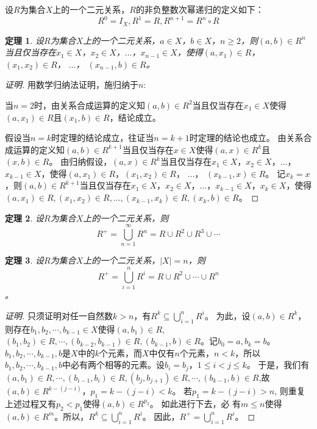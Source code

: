 \documentclass{book}[oneside]
\newtheorem{Thm}{定理}[chapter]
\begin{document}
\begin{CJK*}{UTF8}{gbsn}
  设$R$为集合$X$上的一个二元关系，$R$的非负整数次幂递归的定义如下：
  \[R^0=I_X,R^1=R,R^{n+1}=R^{n}\circ R\]

    \begin{Thm}
    设$R$为集合$X$上的一个二元关系，$a \in X$，$b \in X$，$n \geq 2$，则$(a,b) \in R^n$当且仅当存在$x_1\in X$，$x_2\in X$，$\ldots$，$x_{n-1}\in X$，使得$(a, x_1) \in R$，$(x_1, x_2)\in R$，  $\ldots$， $(x_{n-1}, b)\in R$。
  \end{Thm}
  \begin{proof}[证明]
  用数学归纳法证明，施归纳于$n$:

  当$n=2$时，由关系合成运算的定义知$(a,b)\in R^2$当且仅当存在$x_1\in X$使得$(a,x_1)\in R$且$(x_1, b)\in R$，结论成立。

   假设当$n=k$时定理的结论成立，往证当$n=k+1$时定理的结论也成立。
   由关系合成运算的定义知$(a,b)\in R^{k+1}$当且仅当存在$x\in X$使得$(a,x)\in R^k$且$(x, b)\in R$。 由归纳假设，$(a,x)\in R^k$当且仅当存在$x_1\in X$，$x_2\in X$，$\ldots$，$x_{k-1}\in X$，使得$(a, x_1) \in R$，$(x_1, x_2)\in R$，  $\ldots$， $(x_{k-1}, x)\in R$。 记$x_{k}=x$，则$(a,b)\in R^{k+1}$当且仅当存在$x_1\in X$，$x_2\in X$，$\ldots$，$x_{k-1}\in X$，$x_{k}\in X$，使得$(a, x_1) \in R,(x_1, x_2)\in R,\ldots,(x_{k-1}, x_k)\in R,(x_k, b)\in R$。
\end{proof}
  \begin{Thm}
    设$R$为集合$X$上的一个二元关系，则
    \begin{equation*}
      R^+ = \bigcup_{n=1}^\infty R^n = R \cup R^2 \cup R^3 \cup \cdots 
    \end{equation*}
  \end{Thm}
  \begin{Thm}
    设$R$为集合$X$上的一个二元关系，$|X| = n$，则\[R^+ = \bigcup_{i=1}^nR^i = R \cup R^2  \cup \cdots \cup R^n \]。
  \end{Thm}
  \begin{proof}[证明]
      只须证明对任一自然数$k > n$，有$R^k \subseteq \bigcup_{i=1}^nR^i$。
      为此，设$(a,b) \in R^k$，则存在$b_1, b_2, \cdots, b_{k-1} \in
      X$使得$(a,b_1) \in R$, $(b_1, b_2) \in R, \cdots, (b_{k-2}, b_{k-1})\in R,
      (b_{k-1}, b) \in R$。记$b_0 = a, b_k = b$。  $b_1,b_2, \cdots,
      b_{k-1}, b$是$X$中的$k$个元素，而$X$中仅有$n$个元素，$n < k$，所以$b_1,
      b_2, \cdots, b_{k-1}, b$中必有两个相等的元素。设$b_i=b_j$，$1 \leq i < j
      \leq k$。  于是，我们有$(a,b_1)\in R, \cdots, (b_{i-1}, b_i)\in R,
      (b_j, b_{j+1})\in R, \cdots, (b_{k-1},b)\in R$,故$(a,b)\in
      R^{k-(j-i)}$，$p_1=k-(j-i) < k$。  若$p_1 = k - (j - i) > n$, 则重复
      上述过程又有$p_2 < p_1$使得$(a,b) \in R^{p_2}$。  如此进行下去，必
      有$m \leq n$使得$(a,b) \in R^m$。所以，$R^k \subseteq
      \bigcup_{i=1}^nR^i$。  因此，$R^+=\bigcup_{i=1}^nR^i$。
  \end{proof}


\end{CJK*}
\end{document}
